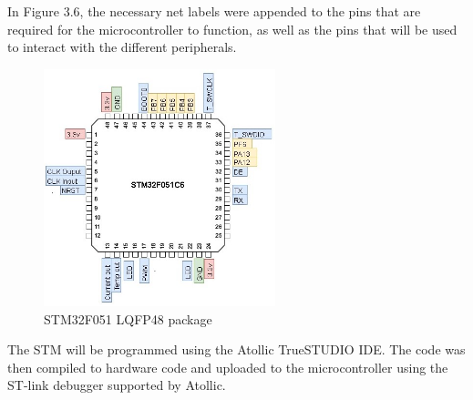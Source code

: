 \vspace{7mm}
In Figure 3.6, the necessary net labels were appended to the pins that are required for the microcontroller to function, as well as the pins that will be used to interact with the different peripherals.\vspace{2mm}
\vspace{10mm}
\begin{figure}[H]
\centering
\vspace{-5mm}
\includegraphics[width=0.6\textwidth]{micro.jpg}
\caption{STM32F051 LQFP48 package\cite{STM}}
\label{fig:STM}
\end{figure}
\vspace{1mm}
The STM will be programmed using the Atollic TrueSTUDIO IDE. The code was then compiled to hardware code and uploaded to the microcontroller using the ST-link debugger supported by Atollic.

\newpage
